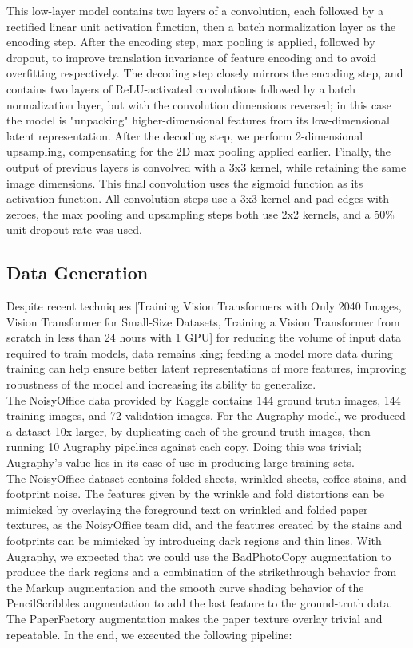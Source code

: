 \documentclass[runningheads]{llncs}
\begin{document}
This low-layer model contains two layers of a convolution, each followed by a rectified linear unit activation function, then a batch normalization layer as the encoding step. After the encoding step, max pooling is applied, followed by dropout, to improve translation invariance of feature encoding and to avoid overfitting respectively. The decoding step closely mirrors the encoding step, and contains two layers of ReLU-activated convolutions followed by a batch normalization layer, but with the convolution dimensions reversed; in this case the model is "unpacking" higher-dimensional features from its low-dimensional latent representation. After the decoding step, we perform 2-dimensional upsampling, compensating for the 2D max pooling applied earlier. Finally, the output of previous layers is convolved with a 3x3 kernel, while retaining the same image dimensions. This final convolution uses the sigmoid function as its activation function. All convolution steps use a 3x3 kernel and pad edges with zeroes, the max pooling and upsampling steps both use 2x2 kernels, and a 50\% unit dropout rate was used.

\subsection{Data Generation}
Despite recent techniques [Training Vision Transformers with Only 2040 Images, Vision Transformer for Small-Size Datasets, Training a Vision Transformer from scratch in less than 24 hours with 1 GPU] for reducing the volume of input data required to train models, data remains king; feeding a model more data during training can help ensure better latent representations of more features, improving robustness of the model and increasing its ability to generalize.\\

The NoisyOffice data provided by Kaggle contains 144 ground truth images, 144 training images, and 72 validation images. For the Augraphy model, we produced a dataset 10x larger, by duplicating each of the ground truth images, then running 10 Augraphy pipelines against each copy. Doing this was trivial; Augraphy's value lies in its ease of use in producing large training sets.\\

The NoisyOffice dataset contains folded sheets, wrinkled sheets, coffee stains, and footprint noise. The features given by the wrinkle and fold distortions can be mimicked by overlaying the foreground text on wrinkled and folded paper textures, as the NoisyOffice team did, and the features created by the stains and footprints can be mimicked by introducing dark regions and thin lines. With Augraphy, we expected that we could use the BadPhotoCopy augmentation to produce the dark regions and a combination of the strikethrough behavior from the Markup augmentation and the smooth curve shading behavior of the PencilScribbles augmentation to add the last feature to the ground-truth data. The PaperFactory augmentation makes the paper texture overlay trivial and repeatable. In the end, we executed the following pipeline:
\end{document}
